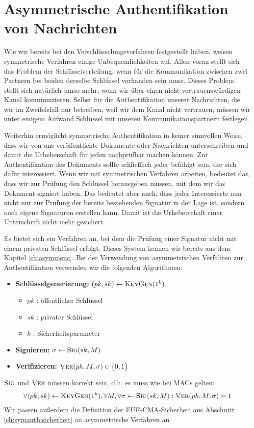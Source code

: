 \chapter{Asymmetrische Authentifikation von Nachrichten}\indexMessageAuthAsymm
\label{cha:asymmauth}

Wie wir bereits bei den Verschlüsselungsverfahren festgestellt haben, weisen symmetrische Verfahren einige Unbequemlichkeiten auf. Allen voran stellt sich das Problem der Schlüsselverteilung, wenn für die Kommunikation zwischen zwei Partnern bei beiden derselbe Schlüssel vorhanden sein muss. Dieses Problem stellt sich natürlich umso mehr, wenn wir über einen nicht vertrauenswürdigen Kanal kommunizieren. Selbst für die Authentifikation unserer Nachrichten, die wir im Zweifelsfall nur betreiben, weil wir dem Kanal nicht vertrauen, müssen wir unter einigem Aufwand Schlüssel mit unseren Kommunikationspartnern festlegen.

Weiterhin ermöglicht symmetrische Authentifikation in keiner sinnvollen Weise, dass wir von uns veröffentlichte Dokumente oder Nachrichten unterschreiben und damit die Urheberschaft für jeden nachprüfbar machen können. Zur Authentifikation des Dokuments sollte schließlich jeder befähigt sein, der sich dafür interessiert. Wenn wir mit symmetrischen Verfahren arbeiten, bedeutet das, dass wir zur Prüfung den Schlüssel herausgeben müssen, mit dem wir das Dokument signiert haben. Das bedeutet aber auch, dass jeder Interessierte nun nicht nur zur Prüfung der bereits bestehenden Signatur in der Lage ist, sondern auch eigene Signaturen erstellen kann. Damit ist die Urheberschaft einer Unterschrift nicht mehr gesichert.

Es bietet sich ein Verfahren an, bei dem die Prüfung einer Signatur nicht mit einem privaten Schlüssel erfolgt. Dieses System kennen wir bereits aus dem Kapitel \ref{ch:asymmenc}. Bei der Verwendung von asymmetrischen Verfahren zur Authentifikation verwenden wir die folgenden Algorithmen:
\begin{itemize}
  \item \textbf{Schlüsselgenerierung:} $(pk, sk) \leftarrow \textsc{KeyGen}(1^k)$
    \begin{itemize}
      \item $pk$ : öffentlicher Schlüssel
      \item $sk$ : privater Schlüssel
      \item $k$ : Sicherheitsparameter
    \end{itemize}
  \item \textbf{Signieren:} $\sigma \leftarrow \textsc{Sig}(sk,M)$
  \item \textbf{Verifizieren:} $\textsc{Ver}(pk,M,\sigma) \in \{ 0,1 \}$
\end{itemize}
$\textsc{Sig}$ und $\textsc{Ver}$ müssen korrekt sein, d.h. es muss wie bei MACs gelten:
\begin{equation*}
    \forall (pk,sk) \leftarrow \textsc{KeyGen}(1^k), \forall M, \forall \sigma \leftarrow \textsc{Sig}(sk,M) : \textsc{Ver}(pk,M,\sigma) = 1
\end{equation*}
Wir passen außerdem die Definition der EUF-CMA-Sicherheit aus Abschnitt
\ref{ch:symauth:sicherheit} an asymmetrische Verfahren an.

